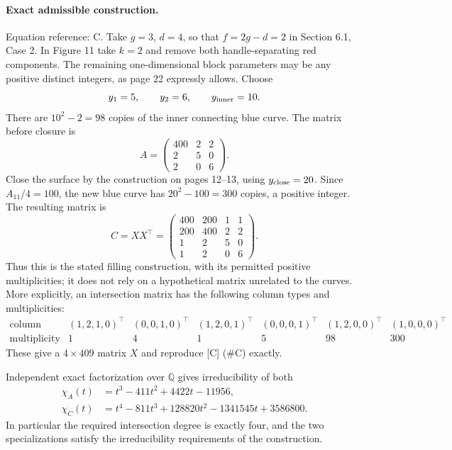 \documentclass[10pt]{article}
\begin{document}
\paragraph*{Exact admissible construction.}\mbox{}\par
Equation reference: C. Take \(g=3\), \(d=4\), so that \(f=2g-d=2\) in Section 6.1, Case 2. In Figure 11 take \(k=2\) and remove both handle-separating red components. The remaining one-dimensional block parameters may be any positive distinct integers, as page 22 expressly allows. Choose \[y_1=5,\qquad y_2=6,\qquad y_{\rm inner}=10.\] There are \(10^2-2=98\) copies of the inner connecting blue curve. The matrix before closure is \[A=\begin{pmatrix}400&2&2\\2&5&0\\2&0&6\end{pmatrix}.\] Close the surface by the construction on pages 12–13, using \(y_{\rm close}=20\). Since \(A_{11}/4=100\), the new blue curve has \(20^2-100=300\) copies, a positive integer. The resulting matrix is \[
 C=XX^\top=
 \begin{pmatrix}
 400&200&1&1\\200&400&2&2\\1&2&5&0\\1&2&0&6
 \end{pmatrix}.\] Thus this is the stated filling construction, with its permitted positive multiplicities; it does not rely on a hypothetical matrix unrelated to the curves. More explicitly, an intersection matrix has the following column types and multiplicities: \[\begin{array}{c|rrrrrr}
\text{column}&(1,2,1,0)^\top&(0,0,1,0)^\top&(1,2,0,1)^\top&
(0,0,0,1)^\top&(1,2,0,0)^\top&(1,0,0,0)^\top\\
\text{multiplicity}&1&4&1&5&98&300
\end{array}\] These give a \(4\times409\) matrix \(X\) and reproduce [C] (\#C) exactly.\par
Independent exact factorization over \(\mathbb Q\) gives irreducibility of both \[\begin{aligned}
 \chi_A(t)&=t^3-411t^2+4422t-11956,\\
 \chi_C(t)&=t^4-811t^3+128820t^2-1341545t+3586800.\end{aligned}\] In particular the required intersection degree is exactly four, and the two specializations satisfy the irreducibility requirements of the construction.\par
\end{document}
